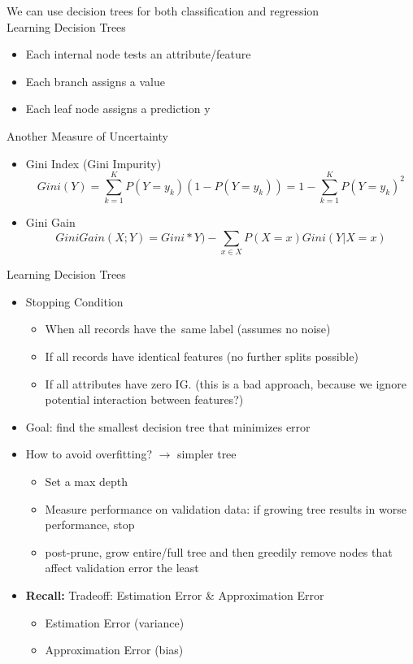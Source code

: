 \documentclass[10pt, oneside]{article}
\begin{document}
We can use decision trees for both classification and regression\\
Learning Decision Trees
\begin{itemize}
    \item Each internal node tests an attribute/feature
    \item Each branch assigns a value 
    \item Each leaf node assigns a prediction y
\end{itemize}
Another Measure of Uncertainty
\begin{itemize}
    \item Gini Index (Gini Impurity)
    \[Gini(Y) = \sum_{k=1} ^K P(Y= y_k) (1-P(Y=y_k))=1-\sum_{k=1}^K P(Y=y_k)^2\]
    \item Gini Gain
    \[GiniGain(X;Y) = Gini*Y) - \sum_{x\in X} P(X=x)Gini(Y|X=x)\]
\end{itemize}
Learning Decision Trees
\begin{itemize}
    \item Stopping Condition
    \begin{itemize}
        \item When all records have the same label (assumes no noise)
        \item If all records have identical features (no further splits possible)
        \item If all attributes have zero IG. (this is a bad approach, because we ignore potential interaction between features?)
    \end{itemize}
    \item Goal: find the smallest decision tree that minimizes error
    \item How to avoid overfitting? $\rightarrow$ simpler tree
    \begin{itemize}
        \item Set a max depth
        \item Measure performance on validation data: if growing tree results in worse performance, stop
        \item post-prune, grow entire/full tree and then greedily remove nodes that affect validation error the least
    \end{itemize}
    \item \textbf{Recall: }Tradeoff: Estimation Error \& Approximation Error
    \begin{itemize}
        \item Estimation Error (variance)
        \item Approximation Error (bias)
    \end{itemize}
\end{itemize}
\end{document}
